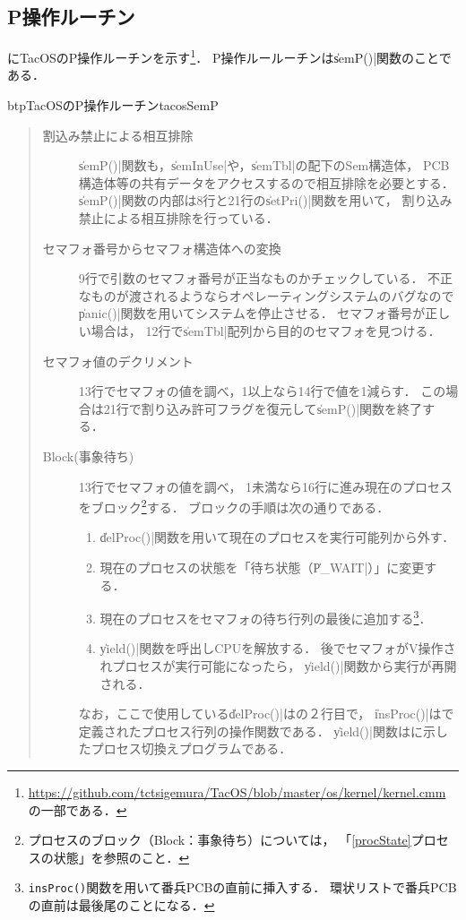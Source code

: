 \subsection{P操作ルーチン}
にTacOSのP操作ルーチンを示す\footnote{
\url{https://github.com/tctsigemura/TacOS/blob/master/os/kernel/kernel.cmm}
の一部である．}．
P操作ルールーチンは\|semP()|関数のことである．

\begin{myfig}{btp}{TacOSのP操作ルーチン}{tacosSemP}

\end{myfig}

\begin{quote}
\begin{description}
\item [割込み禁止による相互排除]
\|semP()|関数も，\|semInUse|や，\|semTbl|の配下のSem構造体，
PCB構造体等の共有データをアクセスするので相互排除を必要とする．
\|semP()|関数の内部は8行と21行の\|setPri()|関数を用いて，
割り込み禁止による相互排除を行っている．

\item [セマフォ番号からセマフォ構造体への変換]
9行で引数のセマフォ番号が正当なものかチェックしている．
不正なものが渡されるようならオペレーティングシステムのバグなので
\|panic()|関数を用いてシステムを停止させる．
セマフォ番号が正しい場合は，
12行で\|semTbl|配列から目的のセマフォを見つける．

\item [セマフォ値のデクリメント]
13行でセマフォの値を調べ，1以上なら14行で値を1減らす．
この場合は21行で割り込み許可フラグを復元して\|semP()|関数を終了する．

\item [Block(事象待ち)]
13行でセマフォの値を調べ，
1未満なら16行に進み現在のプロセスをブロック\footnote{
プロセスのブロック（Block：事象待ち）については，
「\ref{procState}プロセスの状態」を参照のこと．}する．
ブロックの手順は次の通りである．

\begin{enumerate}
\item \|delProc()|関数を用いて現在のプロセスを実行可能列から外す．
\item 現在のプロセスの状態を「待ち状態（\|P_WAIT|）」に変更する．
\item 現在のプロセスをセマフォの待ち行列の最後に追加する\footnote{
{\tt insProc()}関数を用いて番兵PCBの直前に挿入する．
環状リストで番兵PCBの直前は最後尾のことになる．}．
\item \|yield()|関数を呼出しCPUを解放する．
後でセマフォがV操作されプロセスが実行可能になったら，
\|yield()|関数から実行が再開される．
\end{enumerate}

なお，ここで使用している\|delProc()|はの２行目で，
\|insProc()|はで定義されたプロセス行列の操作関数である．
\|yield()|関数はに示したプロセス切換えプログラムである．
\end{description}
\end{quote}

